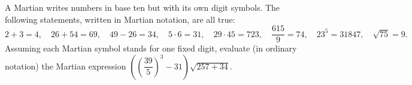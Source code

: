 A Martian writes numbers in base ten but with its own digit symbols. The following statements, written in Martian notation, are all true:
\[
2+3=4,\quad 26+54=69,\quad 49-26=34,\quad 5\cdot6=31,\quad 29\cdot45=723,\quad \dfrac{615}{9}=74,\quad 23^5=31847,\quad \sqrt{75}=9 .
\]
Assuming each Martian symbol stands for one fixed digit, evaluate (in ordinary notation) the Martian expression $\left(\left(\dfrac{39}{5}\right)^3-31\right)\sqrt{257+34}$.
